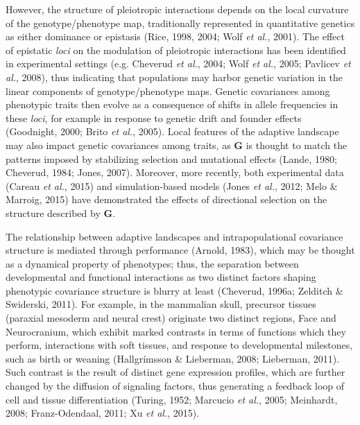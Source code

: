 \documentclass[12pt,twoside]{report}
\begin{document}
However, the structure of pleiotropic interactions depends on the local
curvature of the genotype/phenotype map, traditionally represented in
quantitative genetics as either dominance or epistasis (Rice, 1998,
2004; Wolf \emph{et al.}, 2001). The effect of epistatic \emph{loci} on
the modulation of pleiotropic interactions has been identified in
experimental settings (e.g. Cheverud \emph{et al.}, 2004; Wolf \emph{et
al.}, 2005; Pavlicev \emph{et al.}, 2008), thus indicating that
populations may harbor genetic variation in the linear components of
genotype/phenotype maps. Genetic covariances among phenotypic traits
then evolve as a consequence of shifts in allele frequencies in these
\emph{loci}, for example in response to genetic drift and founder
effects (Goodnight, 2000; Brito \emph{et al.}, 2005). Local features of
the adaptive landscape may also impact genetic covariances among traits,
as $\mathbf{G}$ is thought to match the patterns imposed by stabilizing
selection and mutational effects (Lande, 1980; Cheverud, 1984; Jones,
2007). Moreover, more recently, both experimental data (Careau \emph{et
al.}, 2015) and simulation-based models (Jones \emph{et al.}, 2012; Melo
\& Marroig, 2015) have demonstrated the effects of directional selection
on the structure described by $\mathbf{G}$.

The relationship between adaptive landscapes and intrapopulational
covariance structure is mediated through performance (Arnold, 1983),
which may be thought as a dynamical property of phenotypes; thus, the
separation between developmental and functional interactions as two
distinct factors shaping phenotypic covariance structure is blurry at
least (Cheverud, 1996a; Zelditch \& Swiderski, 2011). For example, in
the mammalian skull, precursor tissues (paraxial mesoderm and neural
crest) originate two distinct regions, Face and Neurocranium, which
exhibit marked contrasts in terms of functions which they perform,
interactions with soft tissues, and response to developmental
milestones, such as birth or weaning (Hallgrímsson \& Lieberman, 2008;
Lieberman, 2011). Such contrast is the result of distinct gene
expression profiles, which are further changed by the diffusion of
signaling factors, thus generating a feedback loop of cell and tissue
differentiation (Turing, 1952; Marcucio \emph{et al.}, 2005; Meinhardt,
2008; Franz-Odendaal, 2011; Xu \emph{et al.}, 2015).
\end{document}
